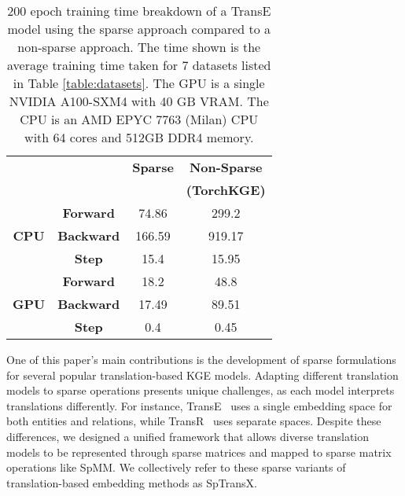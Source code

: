 \begin{table}[h]
\caption{200 epoch training time breakdown of a TransE model using the sparse approach compared to a non-sparse approach. The time shown is the average training time taken for 7 datasets listed in Table \ref{table:datasets}. The GPU is a single NVIDIA A100-SXM4 with 40 GB VRAM. The CPU is an AMD EPYC 7763 (Milan) CPU with 64 cores and 512GB DDR4 memory.}
\centering
\label{intro-table}
\begin{tabular}{|cc|c|c|}
\hline
\multicolumn{2}{|c|}{}                                                  & \textbf{Sparse} & \textbf{Non-Sparse } \\ 
& & & \textbf{(TorchKGE)} \\
\hline
\multicolumn{1}{|c|}{\multirow{3}{*}{\textbf{CPU}}} & \textbf{Forward}  & 74.86           & 299.2               \\ \cline{2-4} 
\multicolumn{1}{|c|}{}                              & \textbf{Backward} & 166.59          & 919.17              \\ \cline{2-4} 
\multicolumn{1}{|c|}{}                              & \textbf{Step}     & 15.4            & 15.95               \\ \hline
\multicolumn{1}{|c|}{\multirow{3}{*}{\textbf{GPU}}} & \textbf{Forward}  & 18.2            & 48.8                \\ \cline{2-4} 
\multicolumn{1}{|c|}{}                              & \textbf{Backward} & 17.49           & 89.51               \\ \cline{2-4} 
\multicolumn{1}{|c|}{}                              & \textbf{Step}     & 0.4             & 0.45                \\ \hline
\end{tabular}

\end{table}

One of this paper's main contributions is the development of sparse formulations for several popular translation-based KGE models. 
Adapting different translation models to sparse operations presents unique challenges, as each model interprets translations differently. 
For instance, TransE~\cite{TransE} uses a single embedding space for both entities and relations, while TransR~\cite{transR} uses separate spaces. Despite these differences, we designed a unified framework that allows diverse translation models to be represented through sparse matrices and mapped to sparse matrix operations like SpMM. We collectively refer to these sparse variants of translation-based embedding methods as SpTransX.


